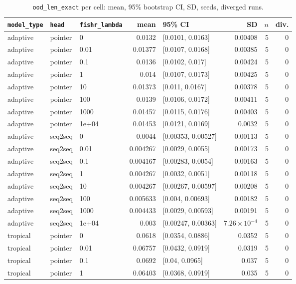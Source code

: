 \documentclass[10pt]{article}
\begin{document}
{\small
\begin{longtable}{lllrlrrr}
\caption{\texttt{ood\_len\_exact} per cell: mean, 95\% bootstrap CI, SD, seeds, diverged runs.}\label{tab:summary-ood_len_exact}\\
\toprule
\texttt{model\_type} & \texttt{head} & \texttt{fishr\_lambda} & mean & 95\% CI & SD & $n$ & div.\\
\midrule
\endhead
adaptive & pointer & 0 & 0.0132 & [0.0101, 0.0163] & 0.00408 & 5 & 0\\
adaptive & pointer & 0.01 & 0.01377 & [0.0107, 0.0168] & 0.00385 & 5 & 0\\
adaptive & pointer & 0.1 & 0.0136 & [0.0102, 0.017] & 0.00424 & 5 & 0\\
adaptive & pointer & 1 & 0.014 & [0.0107, 0.0173] & 0.00425 & 5 & 0\\
adaptive & pointer & 10 & 0.01373 & [0.011, 0.0167] & 0.00378 & 5 & 0\\
adaptive & pointer & 100 & 0.0139 & [0.0106, 0.0172] & 0.00411 & 5 & 0\\
adaptive & pointer & 1000 & 0.01457 & [0.0115, 0.0176] & 0.00403 & 5 & 0\\
adaptive & pointer & 1e+04 & 0.01453 & [0.0121, 0.0169] & 0.0032 & 5 & 0\\
adaptive & seq2seq & 0 & 0.0044 & [0.00353, 0.00527] & 0.00113 & 5 & 0\\
adaptive & seq2seq & 0.01 & 0.004267 & [0.0029, 0.0055] & 0.00173 & 5 & 0\\
adaptive & seq2seq & 0.1 & 0.004167 & [0.00283, 0.0054] & 0.00163 & 5 & 0\\
adaptive & seq2seq & 1 & 0.004267 & [0.0032, 0.0051] & 0.00118 & 5 & 0\\
adaptive & seq2seq & 10 & 0.004267 & [0.00267, 0.00597] & 0.00208 & 5 & 0\\
adaptive & seq2seq & 100 & 0.005633 & [0.004, 0.00693] & 0.00182 & 5 & 0\\
adaptive & seq2seq & 1000 & 0.004433 & [0.0029, 0.00593] & 0.00191 & 5 & 0\\
adaptive & seq2seq & 1e+04 & 0.003 & [0.00247, 0.00363] & $7.26\times10^{-4}$ & 5 & 0\\
tropical & pointer & 0 & 0.0618 & [0.0354, 0.0886] & 0.0352 & 5 & 0\\
tropical & pointer & 0.01 & 0.06757 & [0.0432, 0.0919] & 0.0319 & 5 & 0\\
tropical & pointer & 0.1 & 0.0692 & [0.04, 0.0965] & 0.037 & 5 & 0\\
tropical & pointer & 1 & 0.06403 & [0.0368, 0.0919] & 0.035 & 5 & 0\\

\end{longtable}}
\end{document}
